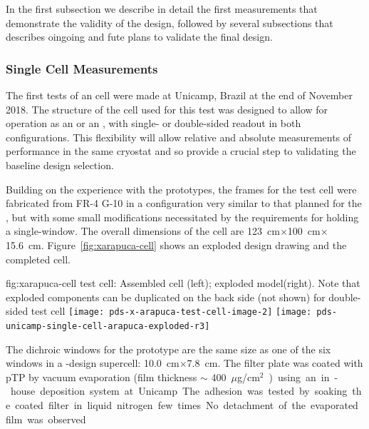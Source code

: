 In the first subsection we describe in detail the first measurements that demonstrate the validity of the design, followed by several subsections that describes oingoing and fute plans to validate the final design.

\subsubsection{Single Cell  Measurements}
\label{sec:xarapuca-unicamp}

The first tests of an  cell were made at Unicamp, Brazil at the end of November 2018. 
The structure of the cell used for this test was designed to allow for operation as an  or an , with single- or double-sided readout in both configurations.  This flexibility will allow relative and absolute measurements of performance in the same cryostat and so provide a crucial step to validating the baseline design selection.

Building on the experience with the  prototypes, the frames for the test cell were fabricated from FR-4 G-10 in a configuration very similar to that planned for the , but with some small modifications necessitated by the requirements for holding a single-window. The overall dimensions of the cell are \SI{123}{cm}$\times$\SI{100}{cm}$\times$\SI{15.6}{cm}. Figure~\ref{fig:xarapuca-cell} shows an exploded design drawing and the completed cell. 

\begin{dunefigure}{fig:xarapuca-cell}
{ test cell:  Assembled cell (left); exploded model(right).  Note that exploded components can be duplicated on the back side (not shown) for double-sided test cell} 
	\texttt{[image: pds-x-arapuca-test-cell-image-2]}
	    \texttt{[image: pds-unicamp-single-cell-arapuca-exploded-r3]}
\end{dunefigure}


The dichroic windows for the prototype are the same size as one of the six windows in a -design  supercell: \SI{10.0}{cm}$\times$\SI{7.8}{cm}. The filter plate was coated with pTP by vacuum evaporation (film thickness $\sim$ \SI{400}{${\mu}$g/cm$^2$})  using an in-house deposition system at Unicamp. The adhesion was tested by soaking the coated filter in liquid nitrogen few times. No detachment of the evaporated film was observed

